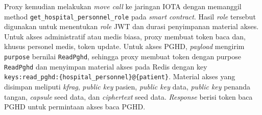 Proxy kemudian melakukan \textit{move call} ke jaringan IOTA dengan memanggil method \texttt{get\_hospital\_personnel\_role} pada \textit{smart contract}. 
Hasil \textit{role} tersebut digunakan untuk menentukan \textit{role} JWT dan durasi penyimpanan material akses. 
Untuk akses administratif atau medis biasa, proxy membuat token baca dan, khusus personel medis, token update. 
Untuk akses PGHD, \textit{payload} mengirim \texttt{purpose} bernilai \texttt{ReadPghd}, sehingga proxy membuat token dengan purpose \texttt{ReadPghd} dan menyimpan material akses pada Redis dengan key \texttt{keys:read\_pghd:\{hospital\_personnel\}@\{patient\}}. 
Material akses yang disimpan meliputi \textit{kfrag}, \textit{public key} pasien, \textit{public key} data, \textit{public key} penanda tangan, \textit{capsule} seed data, dan \textit{ciphertext} seed data. 
\textit{Response} berisi token baca PGHD untuk permintaan akses baca PGHD\@.

